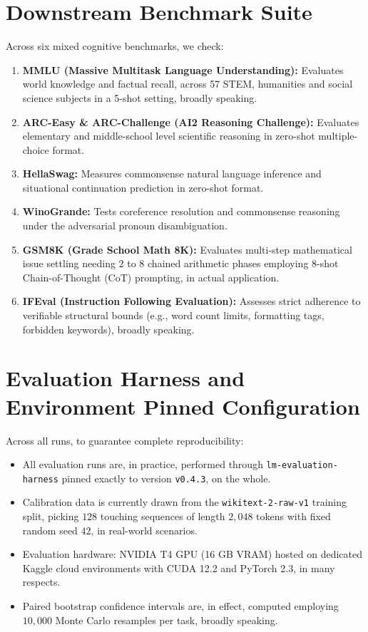 \documentclass[12pt,a4paper,oneside]{report}
\begin{document}
    \section{Downstream Benchmark Suite}
    Across six mixed cognitive benchmarks, we check:
    \begin{enumerate}[leftmargin=*]
        \item \textbf{MMLU (Massive Multitask Language Understanding):} Evaluates world knowledge and factual recall, across 57 STEM, humanities and social science subjects in a 5-shot setting, broadly speaking.
        \item \textbf{ARC-Easy \& ARC-Challenge (AI2 Reasoning Challenge):} Evaluates elementary and middle-school level scientific reasoning in zero-shot multiple-choice format.
        \item \textbf{HellaSwag:} Measures commonsense natural language inference and situational continuation prediction in zero-shot format.
        \item \textbf{WinoGrande:} Tests coreference resolution and commonsense reasoning under the adversarial pronoun disambiguation.
        \item \textbf{GSM8K (Grade School Math 8K):} Evaluates multi-step mathematical issue settling needing $2$ to $8$ chained arithmetic phases employing 8-shot Chain-of-Thought (CoT) prompting, in actual application.
        \item \textbf{IFEval (Instruction Following Evaluation):} Assesses strict adherence to verifiable structural bounds (e.g., word count limits, formatting tags, forbidden keywords), broadly speaking.
    \end{enumerate}

    \section{Evaluation Harness and Environment Pinned Configuration}
    Across all runs, to guarantee complete reproducibility:
    \begin{itemize}[leftmargin=*]
        \item All evaluation runs are, in practice, performed through \texttt{lm-evaluation-harness} pinned exactly to version \texttt{v0.4.3}, on the whole.
        \item Calibration data is currently drawn from the \texttt{wikitext-2-raw-v1} training split, picking $128$ touching sequences of length $2,048$ tokens with fixed random seed $42$, in real-world scenarios.
        \item Evaluation hardware: NVIDIA T4 GPU (16 GB VRAM) hosted on dedicated Kaggle cloud environments with CUDA 12.2 and PyTorch 2.3, in many respects.
        \item Paired bootstrap confidence intervals are, in effect, computed employing $10,000$ Monte Carlo resamples per task, broadly speaking.
    \end{itemize}
\end{document}
